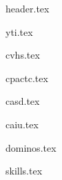 \documentclass[11pt]{article}
\begin{document}
{header.tex}


{yti.tex}

\spacing{}

{cvhs.tex}

\spacing{}

{cpactc.tex}

\spacing{}






{casd.tex}

\spacing{}

{caiu.tex}

\spacing{}

{dominos.tex}

\spacing{}


{skills.tex}
\end{document}
